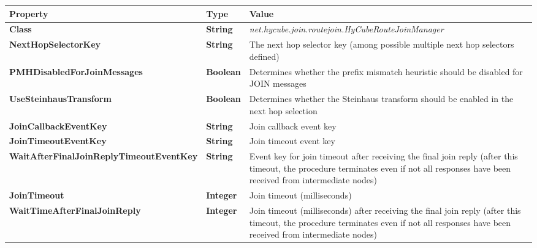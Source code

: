 \begin{table}
\scriptsize
\begin{center}
\begin{tabular}{p{5cm} p{1.5cm} p{8.0cm}}
	\hline
	\textbf{Property}						& \textbf{Type}					& \textbf{Value}					\\[1mm]
    \hline
	\textbf{Class}							& \textbf{String}				& \textit{net.hycube.join.routejoin.HyCubeRouteJoinManager}									\\[1.5mm]	
    \textbf{NextHopSelectorKey}				& \textbf{String}				& The next hop selector key (among possible multiple next hop selectors defined)			\\[1.5mm]	
	\textbf{PMHDisabledForJoinMessages}		& \textbf{Boolean}				& Determines whether the prefix mismatch heuristic should be disabled for JOIN messages		\\[1.5mm]	
	
	\textbf{UseSteinhausTransform}			& \textbf{Boolean}				& Determines whether the Steinhaus transform should be enabled in the next hop selection				\\[1.5mm]	
	\textbf{JoinCallbackEventKey}			& \textbf{String}				& Join callback event key				\\[1.5mm]	
	\textbf{JoinTimeoutEventKey}			& \textbf{String}				& Join timeout event key				\\[1.5mm]		
	\textbf{WaitAfterFinalJoinReplyTimeoutEventKey}			& \textbf{String}				& Event key for join timeout after receiving the final join reply (after this timeout, the procedure terminates even if not all responses have been received from intermediate nodes)			\\[1.5mm]		
	\textbf{JoinTimeout}					& \textbf{Integer}				& Join timeout (milliseconds) 			\\[1.5mm]	
	\textbf{WaitTimeAfterFinalJoinReply}	& \textbf{Integer}				& Join timeout (milliseconds) after receiving the final join reply (after this timeout, the procedure terminates even if not all responses have been received from intermediate nodes) 		\\[1.5mm]	
		

\end{tabular}
\end{center}
\end{table}
